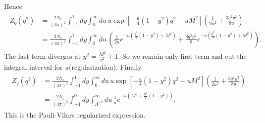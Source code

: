 \documentclass[tightenlines,floatfix,nofootinbib,superscriptaddress,fleqn]{revtex4-2}
\begin{document}
Hence
\begin{align}
  \begin{split}
    Z_q(q^2)&=\frac{2N_c}{(4\pi)^2}
    \int_{-1}^1dy
    \int^\infty_0du\,u
    \exp\left[-\frac{u}{4}\left(
      1-y^2
      \right)q^2-uM^2\right]
      \left(\frac{1}{2u^2}+\frac{3q^2y^2}{8u}\right)  \\
      &=\frac{2N_c}{(4\pi)^2}
      \int_{-1}^1dy
      \int^\infty_0du\,
        \left(\frac{1}{2u}e^{-u\left(\frac{q^2}{4}\left(
          1-y^2
          \right)+M^2\right)}
        +\frac{3q^2y^2}{8}e^{-u\left(\frac{q^2}{4}\left(
          1-y^2
          \right)+M^2\right)}\right).
  \end{split}
\end{align}
The last term diverges at $y^2 = \frac{M^2}{q^2}+1$. So we remain only first term
and cut the integral interval for $u$(regularization). Finally 
\begin{align}
  \begin{split}
    Z_q(q^2)&=\frac{2N_c}{(4\pi)^2}
    \int_{-1}^1dy
    \int^\infty_0du\,u
    \exp\left[-\frac{u}{4}\left(
      1-y^2
      \right)q^2-uM^2\right]
      \left(\frac{1}{2u^2}+\frac{3q^2y^2}{8u}\right)  \\
      &=\frac{2N_c}{(4\pi)^2}
      \int_{-1}^0dy
      \int^\infty_{\Lambda^{-2}}du\,
        \frac{1}{u}e^{-u\left(M^2+
          \frac{q^2}{4}\left(1-y^2
          \right)\right)}.
  \end{split}
\end{align}
This is the Pauli-Vilars regularized expression.
\end{document}
